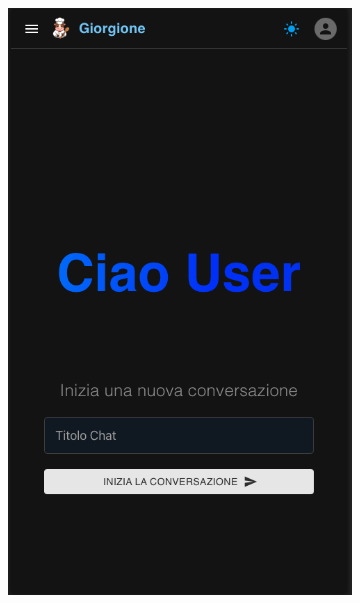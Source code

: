 \begin{figure}[h!]
    \centering
    \begin{subfigure}{0.3\textwidth}
        \centering
        \includegraphics[width=\textwidth]{./img/layoutResponsive1Black.png}
    \end{subfigure}
    \hspace{0.05\textwidth}
    \begin{subfigure}{0.3\textwidth}
        \centering

\end{subfigure}
\end{figure}
